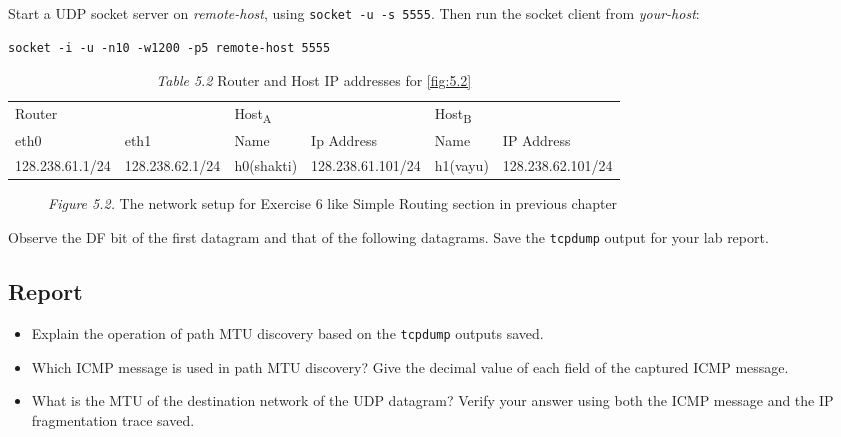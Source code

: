 \documentclass{../UTNetLab}
\begin{document}
	Start a UDP socket server on \textit{remote-host}, using \lstinline{socket -u -s 5555}.
	Then run the socket client from \textit{your-host}:
	\begin{lstlisting}[emph={your-host, remote-host}]
socket -i -u -n10 -w1200 -p5 remote-host 5555
	\end{lstlisting}

	\begin{table}[H]
        \caption{\textit{Table 5.2} Router and Host IP addresses for \autoref{fig:5.2}}
        \vspace{5pt}
        \centering
        \begin{tabular}{ *2l|*2l|*2l }
            \hline \hline
            \multicolumn{2}{l|}{Router} & \multicolumn{2}{l|}{Host\textsubscript{A}} & \multicolumn{2}{l}{Host\textsubscript{B}} \\
            eth0 & eth1 & Name & Ip Address & Name & IP Address \\
            \hline 
            128.238.61.1/24 & 128.238.62.1/24 & h0(shakti) & 128.238.61.101/24 & h1(vayu) & 128.238.62.101/24 \\
            \hline \hline
            \end{tabular}
    \end{table}

    \begin{figure}[H]
        \centering
        \caption{\textit{Figure 5.2.} The network setup for Exercise 6 like Simple Routing section in previous chapter}
		\label{fig:5.2}
    \end{figure}

	Observe the DF bit of the first datagram and that of the following datagrams. Save the \lstinline{tcpdump} output for your lab report.


	\subsection*{Report}
	\begin{itemize}
		\item Explain the operation of path MTU discovery based on the \lstinline{tcpdump} outputs saved.
		\item Which ICMP message is used in path MTU discovery? Give the decimal value of each field of the captured ICMP message.
		\item What is the MTU of the destination network of the UDP datagram? Verify your answer using both the ICMP message and the IP fragmentation trace saved.
	\end{itemize}
\end{document}
